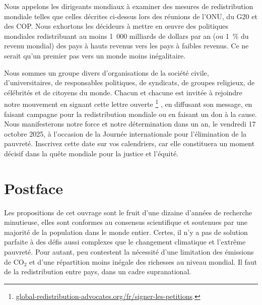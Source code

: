 \documentclass[a5paper,french,openany]{memoir}
\begin{document}
Nous appelons les dirigeants mondiaux à examiner des mesures de redistribution mondiale telles que celles décrites ci-dessus lors des réunions de l'ONU, du G20 et des COP. Nous exhortons les décideurs à mettre en œuvre des politiques mondiales redistribuant au moins 1~000 milliards de dollars par an (ou 1~\% du revenu mondial) des pays à hauts revenus vers les pays à faibles revenus. Ce ne serait qu'un premier pas vers un monde moins inégalitaire.

Nous sommes un groupe divers d'organisations de la société civile, d'universitaires, de responsables politiques, de syndicats, de groupes religieux, de célébrités et de citoyens du monde. Chacun et chacune est invitée à rejoindre notre mouvement en signant cette lettre ouverte
\footnote{\href{https://global-redistribution-advocates.org/fr/signer-les-petitions/?238=true}{global-redistribution-advocates.org/fr/signer-les-petitions}.}%
, en diffusant son message, en faisant campagne pour la redistribution mondiale ou en faisant un don à la cause. Nous manifesterons notre force et notre détermination dans un an, le vendredi 17 octobre 2025, à l'occasion de la Journée internationale pour l'élimination de la pauvreté. Inscrivez cette date sur vos calendriers, car elle constituera un moment décisif dans la quête mondiale pour la justice et l'équité.

\chapter{Postface}

Les propositions de cet ouvrage sont le fruit d'une dizaine d'années de recherche minutieuse, elles sont conformes au consensus scientifique et soutenues par une majorité de la population dans le monde entier. 
Certes, il n'y a pas de solution parfaite à des défis aussi complexes que le changement climatique et l'extrême pauvreté. 
Pour autant, peu contestent la nécessité d'une limitation des émissions de CO$_\text{2}$ et  %
d'une répartition moins inégale des richesses au niveau mondial. Il faut de la redistribution entre pays, dans un cadre supranational. 
\end{document}
